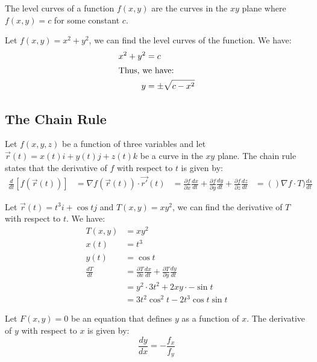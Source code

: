 \documentclass[11pt]{article}
\begin{document}
\begin{definition}
    The level curves of a function $f(x, y)$ are the curves in the $xy$ plane where $f(x, y) = c$ for some constant $c$.
\end{definition}
\begin{example}
    Let $f(x, y) = x^2 + y^2$, we can find the level curves of the function. We have:
    \begin{align*}
        x^2 + y^2 &= c \\
        \intertext{Thus, we have:}
        y &= \pm \sqrt{c - x^2}
    \end{align*}
\end{example}
\subsection{The Chain Rule}
\begin{theorem}
    Let $f(x, y, z)$ be a function of three variables and let $\vec{r}(t) = x(t)i + y(t)j + z(t)k$ be a curve in the $xy$ plane. The chain rule states that the derivative of $f$ with respect to $t$ is given by:
    \begin{align}
        \frac{d}{dt}[f(\vec{r}(t))] &= \nabla f (\vec{r}(t)) \cdot \vec{r'}(t)
        &= \frac{\partial f}{\partial x} \frac{dx}{dt} + \frac{\partial f}{\partial y} \frac{dy}{dt} + \frac{\partial f}{\partial z} \frac{dz}{dt} 
        &= ()\nabla f \cdot T)\frac{ds}{dt}
    \end{align}
\end{theorem}
\begin{example}
    Let $\vec{r}(t) = t^3 i + \cos t j$ and $T(x, y) = xy^2$, we can find the derivative of $T$ with respect to $t$. We have:
    \begin{align*}
        T(x, y) &= xy^2 \\
        x(t) &= t^3 \\
        y(t) &= \cos t \\
        \frac{dT}{dt} &= \frac{\partial T}{\partial x} \frac{dx}{dt} + \frac{\partial T}{\partial y} \frac{dy}{dt} \\
        &= y^2 \cdot 3t^2 + 2xy \cdot -\sin t \\
        &= 3t^2\cos^2 t - 2t^3\cos t \sin t
    \end{align*}
\end{example}
\begin{theorem}
    Let $F(x, y) = 0$ be an equation that defines $y$ as a function of $x$. The derivative of $y$ with respect to $x$ is given by:
    \begin{equation}
        \frac{dy}{dx} = -\frac{f_x}{f_y}
    \end{equation}
\end{theorem}
\end{document}

